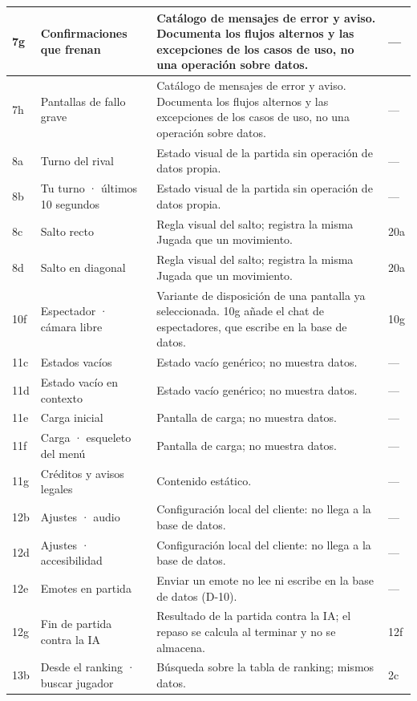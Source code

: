 \begin{center}
\begin{longtable}{|L{0.115\textwidth}|L{0.25\textwidth}|L{0.41\textwidth}|L{0.115\textwidth}|}
7g & Confirmaciones que frenan & Catálogo de mensajes de error y aviso. Documenta los flujos alternos y las excepciones de los casos de uso, no una operación sobre datos. & — \\ \hline
7h & Pantallas de fallo grave & Catálogo de mensajes de error y aviso. Documenta los flujos alternos y las excepciones de los casos de uso, no una operación sobre datos. & — \\ \hline
8a & Turno del rival & Estado visual de la partida sin operación de datos propia. & — \\ \hline
8b & Tu turno · últimos 10 segundos & Estado visual de la partida sin operación de datos propia. & — \\ \hline
8c & Salto recto & Regla visual del salto; registra la misma Jugada que un movimiento. & 20a \\ \hline
8d & Salto en diagonal & Regla visual del salto; registra la misma Jugada que un movimiento. & 20a \\ \hline
10f & Espectador · cámara libre & Variante de disposición de una pantalla ya seleccionada. 10g añade el chat de espectadores, que escribe en la base de datos. & 10g \\ \hline
11c & Estados vacíos & Estado vacío genérico; no muestra datos. & — \\ \hline
11d & Estado vacío en contexto & Estado vacío genérico; no muestra datos. & — \\ \hline
11e & Carga inicial & Pantalla de carga; no muestra datos. & — \\ \hline
11f & Carga · esqueleto del menú & Pantalla de carga; no muestra datos. & — \\ \hline
11g & Créditos y avisos legales & Contenido estático. & — \\ \hline
12b & Ajustes · audio & Configuración local del cliente: no llega a la base de datos. & — \\ \hline
12d & Ajustes · accesibilidad & Configuración local del cliente: no llega a la base de datos. & — \\ \hline
12e & Emotes en partida & Enviar un emote no lee ni escribe en la base de datos (\mbox{D-10}). & — \\ \hline
12g & Fin de partida contra la IA & Resultado de la partida contra la IA; el repaso se calcula al terminar y no se almacena. & 12f \\ \hline
13b & Desde el ranking · buscar jugador & Búsqueda sobre la tabla de ranking; mismos datos. & 2c \\ \hline

\end{longtable}
\end{center}
